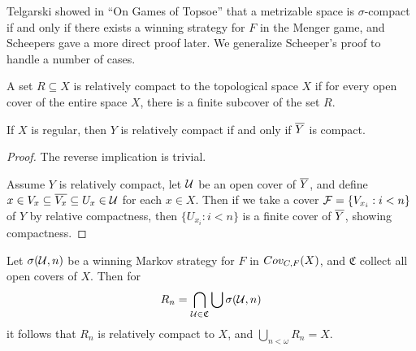   Telgarski showed in ``On Games of Topsoe'' that a metrizable space is $\sigma$-compact if and only if there exists a winning strategy for $F$ in the Menger game, and Scheepers gave a more direct proof later. We generalize Scheeper's proof to handle a number of cases.




  \begin{definition}
    A set $R\subseteq X$ is relatively compact to the topological space $X$ if for every open cover of the entire space $X$, there is a finite subcover of the set $R$.
  \end{definition}

  \begin{proposition}
    If $X$ is regular, then $Y$ is relatively compact if and only if $\overline{Y}$ is compact.
  \end{proposition}

  \begin{proof}
    The reverse implication is trivial. 

    Assume $Y$ is relatively compact, let $\mathcal{U}$ be an open cover of $\overline{Y}$, and define $x\in V_x\subseteq \overline{V_x}\subseteq U_x \in \mathcal{U}$ for each $x\in X$. Then if we take a cover $\mathcal{F} = \{V_{x_i} : i<n\}$ of $Y$ by relative compactness, then $\{U_{x_i}:i<n\}$ is a finite cover of $\overline{Y}$, showing compactness.
  \end{proof}

  \begin{lemma}
    Let $\sigma(\mathcal{U}, n)$ be a winning Markov strategy for $F$ in $Cov_{C,F}(X)$, and $\mathfrak{C}$ collect all open covers of $X$. Then for
      \[
        R_n = \bigcap_{\mathcal{U}\in\mathfrak{C}} \bigcup\sigma(\mathcal{U},n)
      \]
    it follows that $R_n$ is relatively compact to $X$, and $\bigcup_{n<\omega} R_n = X$.
  \end{lemma}

